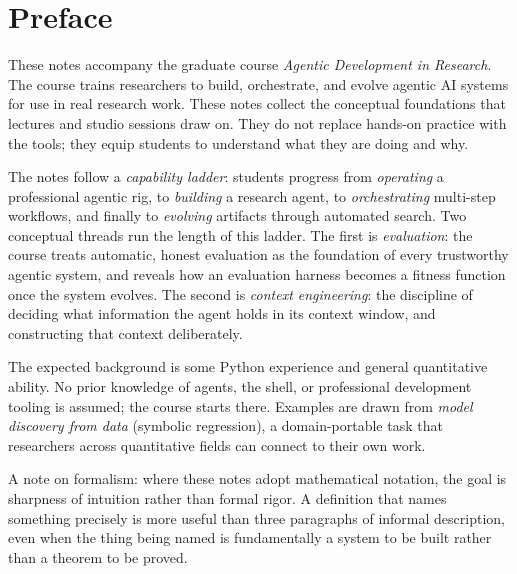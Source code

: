 \chapter*{Preface}

These notes accompany the graduate course \emph{Agentic Development in Research}.
The course trains researchers to build, orchestrate, and evolve agentic AI systems for use in real research work.
These notes collect the conceptual foundations that lectures and studio sessions draw on.
They do not replace hands-on practice with the tools; they equip students to understand what they are doing and why.

The notes follow a \emph{capability ladder}: students progress from \emph{operating} a professional agentic rig, to \emph{building} a research agent, to \emph{orchestrating} multi-step workflows, and finally to \emph{evolving} artifacts through automated search.
Two conceptual threads run the length of this ladder.
The first is \emph{evaluation}: the course treats automatic, honest evaluation as the foundation of every trustworthy agentic system, and reveals how an evaluation harness becomes a fitness function once the system evolves.
The second is \emph{context engineering}: the discipline of deciding what information the agent holds in its context window, and constructing that context deliberately.

The expected background is some Python experience and general quantitative ability.
No prior knowledge of agents, the shell, or professional development tooling is assumed; the course starts there.
Examples are drawn from \emph{model discovery from data} (symbolic regression), a domain-portable task that researchers across quantitative fields can connect to their own work.

A note on formalism: where these notes adopt mathematical notation, the goal is sharpness of intuition rather than formal rigor.
A definition that names something precisely is more useful than three paragraphs of informal description, even when the thing being named is fundamentally a system to be built rather than a theorem to be proved.
